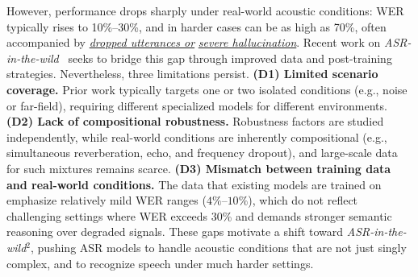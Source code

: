 \documentclass{llmxive}
\begin{document}
However, performance drops sharply under real-world acoustic conditions: WER typically rises to 10\%--30\%, and in harder cases can be as high as 
70\%, often accompanied by \underline{\textit{dropped utterances or}} \underline{\textit{severe hallucination}}. Recent work on \emph{ASR-in-the-wild}~\citep{yan2025improving,asrinthewild} seeks to bridge this gap through improved data and post-training strategies. Nevertheless, three limitations persist.
\textbf{(D1) Limited scenario coverage.} Prior work typically targets one or two isolated conditions (e.g., noise or far-field), requiring different specialized models for different environments. 
\textbf{(D2) Lack of compositional robustness.} Robustness factors are studied independently, while real-world conditions are inherently compositional (e.g., simultaneous reverberation, echo, and frequency dropout), and large-scale data for such mixtures remains scarce. 
\textbf{(D3) Mismatch between training data and real-world conditions.} The data that existing models are trained on emphasize relatively mild WER ranges ($4\%$--$10\%$), which do not reflect challenging settings where WER exceeds 30\% and demands stronger semantic reasoning over degraded signals. These gaps motivate a shift toward \emph{ASR-in-the-wild$^2$}, pushing ASR models to handle acoustic conditions that are not just singly complex, and to recognize speech under much harder settings.
\vspace{-0.5mm}
\end{document}
